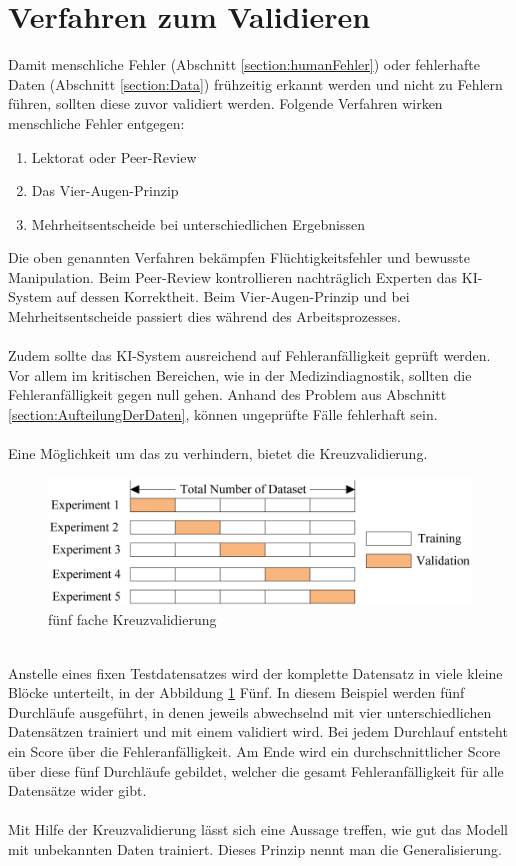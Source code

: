 \documentclass[12pt,oneside,a4paper,parskip]{scrbook}
\begin{document}
\section{Verfahren zum Validieren}
\label{section:validate}

Damit menschliche Fehler (Abschnitt \ref{section:humanFehler}) oder fehlerhafte Daten (Abschnitt \ref{section:Data}) frühzeitig erkannt werden und nicht zu Fehlern führen, sollten diese zuvor validiert werden. Folgende Verfahren wirken menschliche Fehler entgegen:
\begin{enumerate}
	\item Lektorat oder Peer-Review
	\item Das Vier-Augen-Prinzip
	\item Mehrheitsentscheide bei unterschiedlichen Ergebnissen
\end{enumerate}
Die oben genannten Verfahren bekämpfen Flüchtigkeitsfehler und bewusste Manipulation. Beim Peer-Review kontrollieren nachträglich Experten das KI-System auf dessen Korrektheit. Beim Vier-Augen-Prinzip und bei Mehrheitsentscheide passiert dies während des Arbeitsprozesses. 
\\\\
Zudem sollte das KI-System ausreichend auf Fehleranfälligkeit geprüft werden. Vor allem im kritischen Bereichen, wie in der Medizindiagnostik, sollten die Fehleranfälligkeit gegen null gehen. Anhand des Problem aus Abschnitt \ref{section:AufteilungDerDaten}, können ungeprüfte Fälle fehlerhaft sein.
\\\\
Eine Möglichkeit um das zu verhindern, bietet die Kreuzvalidierung. 
\begin{figure}[h]
	\begin{center}
		\includegraphics[width=15cm]{Bilder/crossValidierung.png}
		\caption{fünf fache Kreuzvalidierung}
		\label{fig:crossValidierung}
	\end{center}
\end{figure}
\\Anstelle eines fixen Testdatensatzes wird der komplette Datensatz in viele kleine Blöcke unterteilt, in der Abbildung \ref{fig:crossValidierung} Fünf. In diesem Beispiel werden fünf Durchläufe ausgeführt, in denen jeweils abwechselnd mit vier unterschiedlichen Datensätzen trainiert und mit einem validiert wird. Bei jedem Durchlauf entsteht ein Score über die Fehleranfälligkeit. Am Ende wird ein durchschnittlicher Score über diese fünf Durchläufe gebildet, welcher die gesamt Fehleranfälligkeit für alle Datensätze wider gibt.
\\\\
Mit Hilfe der Kreuzvalidierung lässt sich eine Aussage treffen, wie gut das Modell mit unbekannten Daten trainiert. Dieses Prinzip nennt man die Generalisierung.
\end{document}
